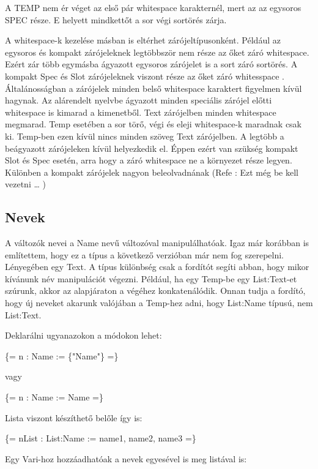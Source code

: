 {A TEMP nem ér véget az első pár whitespace karakternél, mert az az egysoros SPEC része.
E helyett mindkettőt a sor végi sortörés zárja.

A whitespace-k kezelése másban is eltérhet zárójeltípusonként. 
Például az egysoros és kompakt zárójeleknek legtöbbször nem része az őket záró whitespace. 
Ezért zár több egymásba ágyazott egysoros zárójelet is a sort záró sortörés. 
A kompakt Spec és Slot zárójeleknek viszont része az őket záró whitesspace .
Általánosságban a zárójelek minden belső whitespace karaktert figyelmen kívül hagynak. 
Az alárendelt nyelvbe ágyazott minden speciális zárójel előtti whitespace is kimarad a kimenetből. 
Text zárójelben minden whitespace megmarad. 
Temp esetében a sor törő, végi és eleji whitespace-k maradnak csak ki. 
Temp-ben ezen kívül nincs minden szöveg Text zárójelben. 
A legtöbb a beágyazott zárójeleken kívül helyezkedik el. 
Éppen ezért van szükség kompakt Slot és Spec esetén, arra hogy a záró whitespace ne a környezet része legyen. 
Különben a kompakt zárójelek nagyon beleolvadnának (Refe : Ezt még be kell vezetni … )



\subsection{Nevek}
\label{sec:SName}
A változók nevei a Name nevű változóval manipulálhatóak.
Igaz már korábban is említettem, hogy ez a típus a következő verzióban már nem fog szerepelni.
Lényegében egy Text.
A típus különbség csak a fordítót segíti abban, hogy mikor kívánunk név manipulációt végezni.
Például, ha egy Temp-be egy List:Text-et szúrunk, akkor az alapjáraton a végéhez konkatenálódik.
Onnan tudja a fordító, hogy új neveket akarunk valójában a Temp-hez adni, hogy List:Name típusú, nem List:Text.

Deklarálni ugyanazokon a módokon lehet:

\{= n : Name := \{"Name"\} =\}

vagy

\{= n : Name := Name =\}

Lista viszont készíthető belőle így is:

\{= nList : List:Name := name1, name2, name3 =\}

Egy Vari-hoz hozzáadhatóak a nevek egyesével is meg listával is:

}
